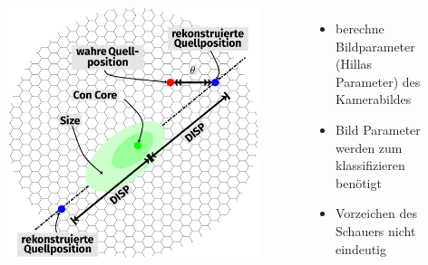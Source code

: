 \documentclass[aspectratio=1610, professionalfonts, 9pt]{beamer}
\begin{document}
\begin{frame}
  \begin{columns}[onlytextwidth]
	\begin{figure}
	  \centering
	  \includegraphics[height=0.8\textheight]{./tikz/Camera/Camera.pdf}
	\end{figure}
	\begin{itemize}
	  \item berechne Bildparameter (Hillas Parameter) des Kamerabildes
	  \item Bild Parameter werden zum klassifizieren benötigt
	  \item Vorzeichen des Schauers nicht eindeutig
	\end{itemize}
  \end{columns}
\end{frame}
\end{document}
